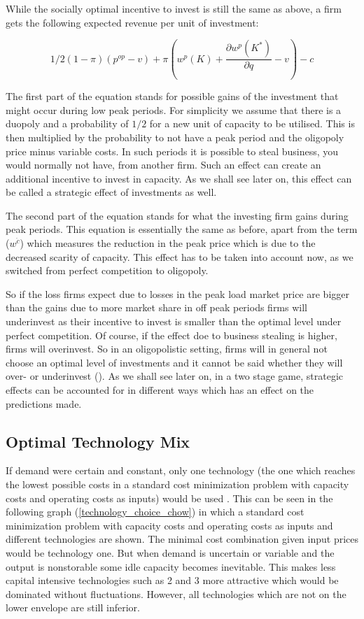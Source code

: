 While the socially optimal incentive to invest is still the same as above, a firm gets the following expected revenue per unit of investment:

\begin{equation}
	1/2 (1-\pi) (p^{op}-v) + \pi (w^p(K)+\frac{\partial w^p(K^*)}{\partial q}-v) - c
\end{equation}

The first part of the equation stands for possible gains of the investment that might occur during low peak periods. For simplicity we assume that there is a duopoly and a probability of $1/2$ for a new unit of capacity to be utilised. This is then multiplied by the probability to not have a peak period and the oligopoly price minus variable costs. In such periods it is possible to steal business, you would normally not have, from another firm. Such an effect can create an additional incentive to invest in capacity. As we shall see later on, this effect can be called a strategic effect of investments as well.

The second part of the equation stands for what the investing firm gains during peak periods. This equation is essentially the same as before, apart from the term ($w^{\acute{c}}$) which measures the reduction in the peak price which is due to the decreased scarity of capacity. This effect has to be taken into account now, as we switched from perfect competition to oligopoly.

So if the loss firms expect due to losses in the peak load market price are bigger than the gains due to more market share in off peak periods firms will underinvest as their incentive to invest is smaller than the optimal level under perfect competition. Of course, if the effect doe to business stealing is higher, firms will overinvest. So in an oligopolistic setting, firms will in general not choose an optimal level of investments and it cannot be said whether they will over- or underinvest (\cite{Fehr1995}). As we shall see later on, in a two stage game, strategic effects can be accounted for in different ways which has an effect on the predictions made.

\subsection{Optimal Technology Mix}

If demand were certain and constant, only one technology (the one which reaches the lowest possible costs in a standard cost minimization problem with capacity costs and operating costs as inputs) would be used \citep[see][pg. 183]{Chao1983}. This can be seen in the following graph (\ref{technology_choice_chow}) in which a standard cost minimization problem with capacity costs and operating costs as inputs and different technologies are shown. The minimal cost combination given input prices would be technology one. But when demand is uncertain or variable and the output is nonstorable some idle capacity becomes inevitable. This makes less capital intensive technologies such as 2 and 3 more attractive which would be dominated without fluctuations. However, all technologies which are not on the lower envelope are still inferior.


